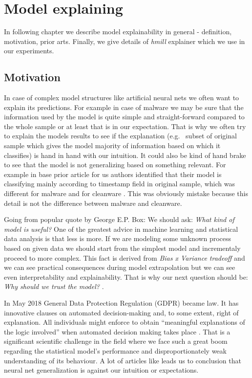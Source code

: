 \chapter{Model explaining} \label{chap:expth}
In following chapter we describe model explainability in general - definition, motivation, prior arts. Finally, we give details of \emph{hmill} explainer which we use in our experiments.

\section{Motivation}
In case of complex model structures like artificial neural nets we often want to explain its predictions. For example in case of malware we may be sure that the information used by the model is quite simple and straight-forward compared to the whole sample or at least that is in our expectation. That is why we often try to explain the models results to see if the explanation (e.g. \ subset of original sample which gives the model majority of information based on which it classifies) is hand in hand with our intuition. It could also be kind of hand brake to see that the model is not generalizing based on something relevant. For example in base prior article for us authors identified that their model is classifying mainly according to timestamp field in original sample, which was different for malware and for cleanware \cite{Pevny2020}. This was obviously mistake because this detail is not the difference between malware and cleanware.

Going from popular quote by George E.P. Box:  We should ask: \emph{What kind of model is useful?}
One of the greatest advice in machine learning and statistical data analysis is that less is more. If we are modeling some unknown process based on given data we should start from the simplest model and incrementaly proceed to more complex. 
This fact is derived from \emph{Bias x Variance tradeoff}  and we can see practical consequences during model extrapolation but we can see even interpretability and explainability. That is why our next question should be: \emph{Why should we trust the model?} \cite{Ribeiro2016}.

In May 2018 General Data Protection Regulation (GDPR) became law. It has innovative clauses on automated decision-making and, to some extent, right of explanation. All individuals might enforce to obtain “meaningful explanations of the logic involved” when automated decision making takes place \cite{Guidotti2018}. That is a significant scientific challenge in the field where we face such a great boom regarding the statistical model's performance and disproportionately weak understanding of its behaviour. A lot of articles like \cite{Zhang2016} leads us to conclusion that neural net generalization is against our intuition or expectations.

